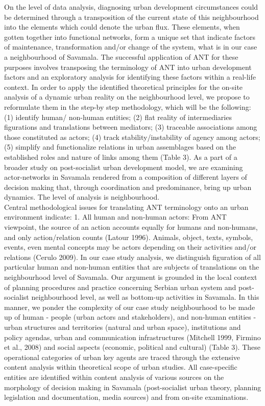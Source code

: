 \documentclass[11pt]{report}
\begin{document}
On the level of data analysis, diagnosing urban development circumstances could be determined through a transposition of the current state of this neighbourhood into the elements which could denote the urban flux. These elements, when gotten together into functional networks, form a unique set that indicate factors of maintenance, transformation and/or change of the system, what is in our case a neighbourhood of Savamala. The successful application of ANT for these purposes involves transposing the terminology of ANT into urban development factors and an exploratory analysis for identifying these factors within a real-life context. In order to apply the identified theoretical principles for the on-site analysis of a dynamic urban reality on the neighbourhood level, we propose to reformulate them in the step-by step methodology, which will be the following: (1) identify human/ non-human entities; (2) flat reality of intermediaries figurations and translations between mediators; (3) traceable associations among those constituted as actors; (4) track stability/instability of agency among actors; (5) simplify and functionalize relations in urban assemblages based on the established roles and nature of links among them (Table 3). As a part of a broader study on post-socialist urban development model, we are examining actor-networks in Savamala rendered from a composition of different layers of decision making that, through coordination and predominance, bring up urban dynamics. The level of analysis is neighbourhood. 
\\
Central methodological issues for translating ANT terminology onto an urban environment indicate: 
1.	All human and non-human actors: From ANT viewpoint, the source of an action accounts equally for humans and non-humans, and only action/relation counts (Latour 1996). Animals, object, texts, symbols, events, even mental concepts may be actors depending on their activities and/or relations (Cerulo 2009).
In our case study analysis, we distinguish figuration of all particular human and non-human entities that are subjects of translations on the neighbourhood level of Savamala. Our argument is grounded in the local context of planning procedures and practice concerning Serbian urban system and post-socialist neighbourhood level, as well as bottom-up activities in Savamala. In this manner, we ponder the complexity of our case study neighbourhood to be made up of human - people (urban actors and stakeholders), and non-human entities - urban structures and territories (natural and urban space), institutions and policy agendas, urban and communication infrastructures  (Mitchell 1999, Firmino et al., 2008) and social aspects (economic, political and cultural) (Table 3). These operational categories of urban key agents are traced through the extensive content analysis within theoretical scope of urban studies. All case-specific entities are identified within content analysis of various sources on the morphology of decision making in Savamala (post-socialist urban theory, planning legislation and documentation, media sources) and from on-site examinations.
\end{document}
